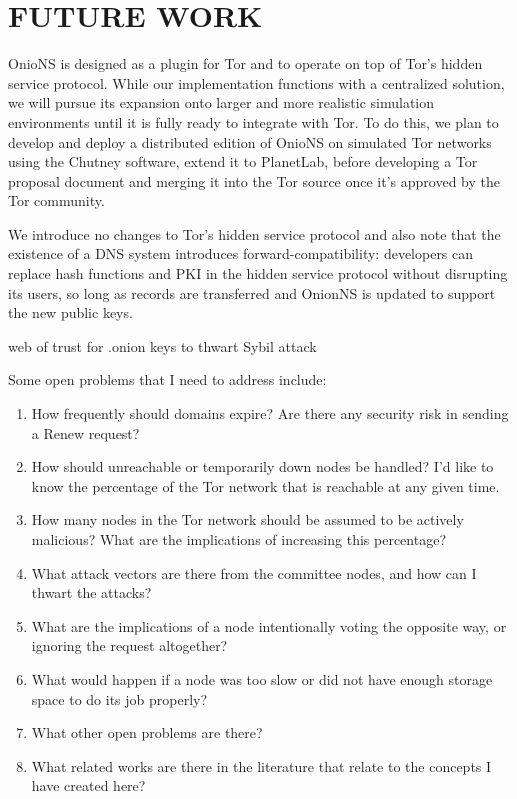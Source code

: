 
\chapter{FUTURE WORK}

OnioNS is designed as a plugin for Tor and to operate on top of Tor's hidden service protocol. While our implementation functions with a centralized solution, we will pursue its expansion onto larger and more realistic simulation environments until it is fully ready to integrate with Tor. To do this, we plan to develop and deploy a distributed edition of OnioNS on simulated Tor networks using the Chutney software, extend it to PlanetLab, before developing a Tor proposal document and merging it into the Tor source once it's approved by the Tor community.

We introduce no changes to Tor's hidden service protocol and also note that the existence of a DNS system introduces forward-compatibility: developers can replace hash functions and PKI in the hidden service protocol without disrupting its users, so long as records are transferred and OnionNS is updated to support the new public keys.

web of trust for .onion keys to thwart Sybil attack

Some open problems that I need to address include:

\begin{enumerate}
	\item How frequently should domains expire? Are there any security risk in sending a Renew request?
	\item How should unreachable or temporarily down nodes be handled? I'd like to know the percentage of the Tor network that is reachable at any given time.
	\item How many nodes in the Tor network should be assumed to be actively malicious? What are the implications of increasing this percentage?
	\item What attack vectors are there from the committee nodes, and how can I thwart the attacks?
	\item What are the implications of a node intentionally voting the opposite way, or ignoring the request altogether?
	\item What would happen if a node was too slow or did not have enough storage space to do its job properly?
	\item What other open problems are there?
	\item What related works are there in the literature that relate to the concepts I have created here?
\end{enumerate}